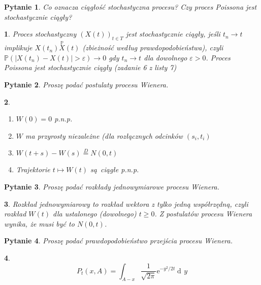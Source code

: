 \documentclass[10pt]{mwart}
\theoremstyle{plain}
\newtheorem{pytanie}{Pytanie}
\theoremstyle{break}
\newtheorem*{odpowiedź}{}
\newcommand*{\e}{\mathrm{e}}
\DeclareMathOperator{\diff}{d\!}
\begin{document}
\begin{pytanie}
Co oznacza ciągłość stochastyczna procesu? Czy proces Poissona jest stochastycznie ciągły?
\end{pytanie}
\begin{odpowiedź}
    Proces stochastyczny $(X(t))_{t \in T}$ jest stochastycznie
    ciągły, jeśli $t_n \to t$ implikuje $X(t_n) \overset {\mathbb{P}} X(t)$
    (zbieżność według prawdopodobieństwa), czyli
    $\mathbb{P}(|X(t_n) - X(t)| > \varepsilon) \to 0$ gdy $t_n \to t$ dla
    dowolnego $\varepsilon > 0$. Proces Poissona jest stochastycznie
    ciągły (zadanie 6 z listy 7)
\end{odpowiedź}


\begin{pytanie}
Proszę podać postulaty procesu Wienera.
\end{pytanie}
\begin{odpowiedź}
\begin{enumerate}
    \item $W(0) = 0$ p.n.p.
    \item $W$ ma przyrosty niezależne (dla rozłącznych odcinków $(s_i, t_i)$
    \item $W(t+s) - W(s) \overset D = N(0, t)$
    \item Trajektorie $t \mapsto W(t)$ są ciągłe p.n.p.
\end{enumerate}
\end{odpowiedź}


\begin{pytanie}
Proszę podać rozkłady jednowymiarowe procesu Wienera.
\end{pytanie}
\begin{odpowiedź}
    Rozkład jednowymiarowy to rozkład wektora z tylko jedną współrzędną,
    czyli rozkład $W(t)$ dla ustalonego (dowolnego) $t \geq 0$.
    Z postulatów procesu Wienera wynika, że musi być to $N(0, t)$.
\end{odpowiedź}


\begin{pytanie}
Proszę podać prawdopodobieństwo przejścia procesu Wienera.
\end{pytanie}
\begin{odpowiedź}
\[
    P_t(x, A) = \int_{A - x}\frac 1 {\sqrt{2\pi}} \e^{-y^2/2t} \diff y
\] 
\end{odpowiedź}
\end{document}
